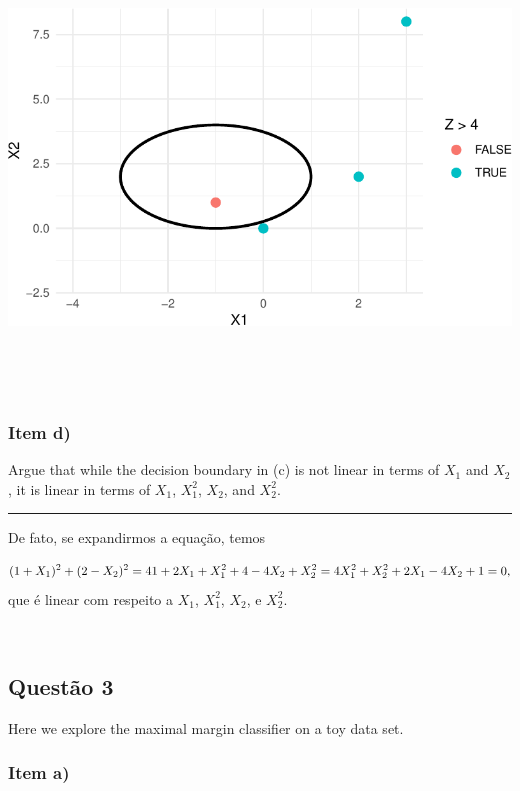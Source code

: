\documentclass[
  a4paperpaper,
]{article}
\begin{document}
\includegraphics{lista-5_files/figure-pdf/unnamed-chunk-6-1.pdf}

~

~

\subsubsection{Item d)}\label{item-d}

Argue that while the decision boundary in (c) is not linear in terms of
\(X_1\) and \(X_2\), it is linear in terms of \(X_1\), \(X^2_1\),
\(X_2\), and \(X^2_2\).

\begin{center}\rule{0.5\linewidth}{0.5pt}\end{center}

De fato, se expandirmos a equação, temos

\[
(1 + X_1)^2 + (2 - X_2)^2 = 4 \\ 
1 + 2X_1 + X^2_1 + 4 - 4X_2 + X^2_2 = 4 \\
X^2_1 + X^2_2 +2X_1 - 4X_2 +1 = 0, 
\] que é linear com respeito a \(X_1\), \(X^2_1\), \(X_2\), e \(X^2_2\).

~

\subsection{Questão 3}\label{questuxe3o-3}

Here we explore the maximal margin classifier on a toy data set.

\subsubsection{Item a)}\label{item-a-2}
\end{document}
